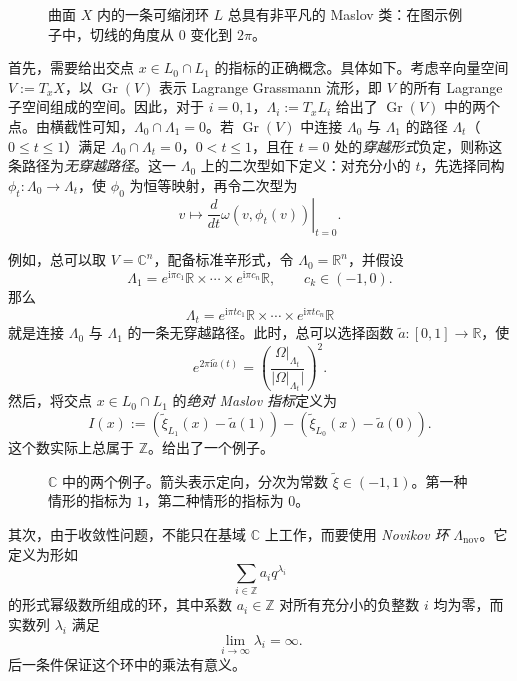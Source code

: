 \begin{figure}[H]
\centering
{}
\caption{曲面 $X$ 内的一条可缩闭环 $L$ 总具有非平凡的 Maslov 类：在图示例子中，切线的角度从 $0$ 变化到 $2\pi$。}\label{fig:8.17}
\end{figure}

首先，需要给出交点 $x\in L_0\cap L_1$ 的指标的正确概念。具体如下。考虑辛向量空间 $V:=T_xX$，以 $\operatorname{Gr}(V)$ 表示 Lagrange Grassmann 流形，即 $V$ 的所有 Lagrange 子空间组成的空间。因此，对于 $i=0,1$，$\Lambda_i:=T_xL_i$ 给出了 $\operatorname{Gr}(V)$ 中的两个点。由横截性可知，$\Lambda_0\cap\Lambda_1=0$。若 $\operatorname{Gr}(V)$ 中连接 $\Lambda_0$ 与 $\Lambda_1$ 的路径 $\Lambda_t$（$0\leq t\leq1$）满足 $\Lambda_0\cap\Lambda_t=0$，$0<t\leq1$，且在 $t=0$ 处的\emph{穿越形式}负定，则称这条路径为\emph{无穿越路径}。这一 $\Lambda_0$ 上的二次型如下定义：对充分小的 $t$，先选择同构 $\phi_t\colon\Lambda_0\to\Lambda_t$，使 $\phi_0$ 为恒等映射，再令二次型为
\[
v\longmapsto\left.\frac{d}{dt}\omega(v,\phi_t(v))\right|_{t=0}.
\]

例如，总可以取 $V=\mathbb C^n$，配备标准辛形式，令 $\Lambda_0=\mathbb R^n$，并假设
\[
\Lambda_1=e^{\mathrm i\pi c_1}\mathbb R\times\cdots\times
e^{\mathrm i\pi c_n}\mathbb R,\qquad c_k\in(-1,0).
\]
那么
\[
\Lambda_t=e^{\mathrm i\pi t c_1}\mathbb R\times\cdots\times
e^{\mathrm i\pi t c_n}\mathbb R
\]
就是连接 $\Lambda_0$ 与 $\Lambda_1$ 的一条无穿越路径。此时，总可以选择函数 $\widetilde a\colon[0,1]\to\mathbb R$，使
\[
e^{2\pi\mathrm i\widetilde a(t)}
=\left(\frac{\Omega|_{\Lambda_t}}{|\Omega|_{\Lambda_t}|}\right)^2.
\]
然后，将交点 $x\in L_0\cap L_1$ 的\emph{绝对 Maslov 指标}定义为
\[
I(x):=(\widetilde\xi_{L_1}(x)-\widetilde a(1))
-(\widetilde\xi_{L_0}(x)-\widetilde a(0)).
\]
这个数实际上总属于 $\mathbb Z$。给出了一个例子。

\begin{figure}[H]
\centering
{}
\caption{$\mathbb C$ 中的两个例子。箭头表示定向，分次为常数 $\widetilde\xi\in(-1,1)$。第一种情形的指标为 $1$，第二种情形的指标为 $0$。}\label{fig:8.18}
\end{figure}

其次，由于收敛性问题，不能只在基域 $\mathbb C$ 上工作，而要使用 \emph{Novikov 环} $\Lambda_{\mathrm{nov}}$。它定义为形如
\[
\sum_{i\in\mathbb Z}a_iq^{\lambda_i}
\]
的形式幂级数所组成的环，其中系数 $a_i\in\mathbb Z$ 对所有充分小的负整数 $i$ 均为零，而实数列 $\lambda_i$ 满足
\[
\lim_{i\to\infty}\lambda_i=\infty.
\]
后一条件保证这个环中的乘法有意义。

